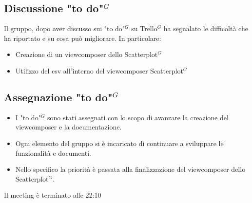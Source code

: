 \subsection{Discussione "to do"$^{G}$}
Il gruppo, dopo aver discusso sui "to do"$^{G}$ su Trello$^{G}$ ha segnalato le difficoltà che ha riportato e su cosa può migliorare. In particolare:
\begin{itemize}
	\item Creazione di un viewcomposer dello Scatterplot$^{G}$
	\item Utilizzo del csv all'interno del viewcomposer Scatterplot$^{G}$
\end{itemize}

\subsection{Assegnazione "to do"$^{G}$}
\begin{itemize}
	\item I "to do"$^{G}$ sono stati assegnati con lo scopo di avanzare la creazione del viewcomposer e la documentazione.
	\item Ogni elemento del gruppo si è incaricato di continuare a sviluppare le funzionalità e documenti.
	\item Nello specifico la priorità è passata alla finalizzazione del viewcomposer dello Scatterplot$^{G}$.
\end{itemize}

Il meeting è terminato alle 22:10

